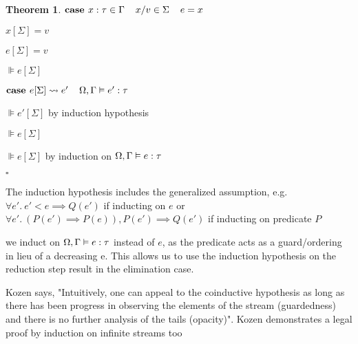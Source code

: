 \documentclass[acmsmall]{acmart}
\theoremstyle{definition}
\newtheorem{theorem}{Theorem}[section]
\begin{document}
\begin{theorem}
    \item \Z {}

    \item \Z $\textbf{case } 
      x : \tau \in \Gamma
      \hspace{4mm} 
      x \slash v \in \Sigma
      \hspace{4mm} 
      e = x
    $
      \item \Z\Z $x[\Sigma] = v$
      \item \Z\Z $e[\Sigma] = v$
      \item \Z\Z $\VDash e[\Sigma] $

    \item \Z $\textbf{case } 
      e[\Sigma] \rightsquigarrow e' 
      \hspace{4mm} 
      \Omega, \Gamma \vDash e' : \tau
    $ 
      \item \Z\Z $\VDash e'[\Sigma] $ by induction hypothesis
      \item \Z\Z $\VDash e[\Sigma] $

    \item \Z $\VDash e[\Sigma] $ by induction on $\Omega, \Gamma \vDash e : \tau$
  \item $\square$
  \item {}
\end{theorem}

\noindent
{} The induction hypothesis includes the generalized assumption, e.g. $\forall e' .\ e' < e \implies Q(e')$ if inducting on $e$ or $\forall e' .\ (P(e') \implies P(e)), P(e') \implies Q(e')$ if inducting on predicate $P$

\noindent
{} we induct on $\Omega, \Gamma \vDash e : \tau$ instead of $e$, as the predicate acts as a guard/ordering in lieu of a decreasing e.
This allows us to use the induction hypothesis on the reduction step result in the elimination case.

\noindent
{} Kozen says, "Intuitively, one can appeal to the coinductive hypothesis as long as there
has been progress in observing the elements of the stream (guardedness) and there is no
further analysis of the tails (opacity)".  Kozen demonstrates a legal proof by induction on infinite streams too

\end{document}
